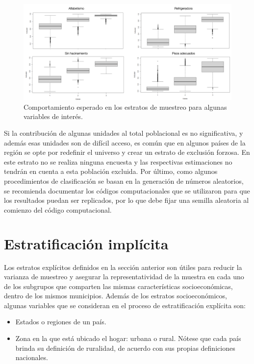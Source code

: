 \documentclass[
  12pt,
  spanish,
]{book}
\providecommand{\tightlist}{%
  \setlength{\itemsep}{0pt}\setlength{\parskip}{0pt}}
\begin{document}
\begin{figure}
\includegraphics[width=800px]{Pics/Estratificar} \caption{Comportamiento esperado en los estratos de muestreo para algunas variables de interés.}\label{fig:estrata}
\end{figure}

Si la contribución de algunas unidades al total poblacional es no significativa, y además esas unidades son de difícil acceso, es común que en algunos países de la región se opte por redefinir el universo y crear un estrato de exclusión forzosa. En este estrato no se realiza ninguna encuesta y las respectivas estimaciones no tendrán en cuenta a esta población excluida. Por último, como algunos procedimientos de clasificación se basan en la generación de números aleatorios, se recomienda documentar los códigos computacionales que se utilizaron para que los resultados puedan ser replicados, por lo que debe fijar una semilla aleatoria al comienzo del código computacional.

\hypertarget{estratificaciuxf3n-impluxedcita}{%
\section{Estratificación implícita}\label{estratificaciuxf3n-impluxedcita}}

Los estratos explícitos definidos en la sección anterior son útiles para reducir la varianza de muestreo y asegurar la representatividad de la muestra en cada uno de los subgrupos que comparten las mismas características socioeconómicas, dentro de los mismos municipios. Además de los estratos socioeconómicos, algunas variables que se consideran en el proceso de estratificación explícita son:

\begin{itemize}
\tightlist
\item
  Estados o regiones de un país.
\item
  Zona en la que está ubicado el hogar: urbana o rural. Nótese que cada país brinda su definición de ruralidad, de acuerdo con sus propias definiciones nacionales.
\end{itemize}
\end{document}
